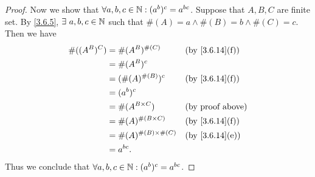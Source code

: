 \begin{proof}
  Now we show that \(\forall a, b, c \in \mathbb{N} : (a^b)^c = a^{bc}\).
  Suppose that \(A, B, C\) are finite set.
  By \cref{3.6.5}, \(\exists\ a, b, c \in \N\) such that \(\#(A) = a \land \#(B) = b \land \#(C) = c\).
  Then we have
  \begin{align*}
    \#((A^B)^C) & = \#(A^B)^{\#(C)}            &  & \text{(by \cref{3.6.14}(f))} \\
                & = \#(A^B)^c                                                    \\
                & = (\#(A)^{\#(B)})^c          &  & \text{(by \cref{3.6.14}(f))} \\
                & = (a^b)^c                                                      \\
                & = \#(A^{B \times C})         &  & \text{(by proof above)}      \\
                & = \#(A)^{\#(B \times C)}     &  & \text{(by \cref{3.6.14}(f))} \\
                & = \#(A)^{\#(B) \times \#(C)} &  & \text{(by \cref{3.6.14}(e))} \\
                & = a^{bc}.
  \end{align*}
  Thus we conclude that \(\forall a, b, c \in \mathbb{N} : (a^b)^c = a^{bc}\).


\end{proof}

